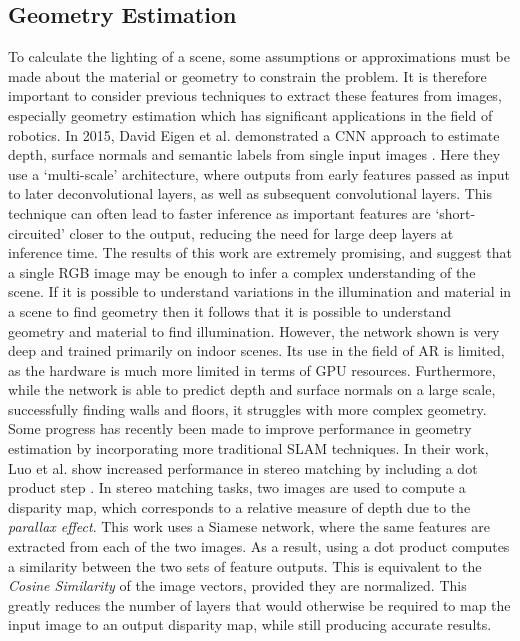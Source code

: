 \documentclass[ %
                    author={Gavin Parker},
                supervisor={Dr. Neill Campbell},
                    degree={MEng},
                     title={Deep Learning for Illumination Estimation from Stereo Images},
                  subtitle={},
                      type={Research},
                      year={2018} ]{dissertation}
\begin{document}
\subsection{Geometry Estimation}
To calculate the lighting of a scene, some assumptions or approximations must be made about the material or geometry to constrain the problem. It is therefore important to consider previous techniques to extract these features from images, especially geometry estimation which has significant applications in the field of robotics. In 2015, David Eigen et al. demonstrated a CNN approach to estimate depth, surface normals and semantic labels from single input images \cite{7410661}. Here they use a `multi-scale' architecture, where outputs from early features passed as input to later deconvolutional layers, as well as subsequent convolutional layers. This technique can often lead to faster inference as important features are `short-circuited' closer to the output, reducing the need for large deep layers at inference time. The results of this work are extremely promising, and suggest that a single RGB image may be enough to infer a complex understanding of the scene. If it is possible to understand variations in the illumination and material in a scene to find geometry then it follows that it is possible to understand geometry and material to find illumination.  However, the network shown is very deep and trained primarily on indoor scenes. Its use in the field of AR is limited, as the hardware is much more limited in terms of GPU resources. Furthermore, while the network is able to predict depth and surface normals on a large scale, successfully finding walls and floors, it struggles with more complex geometry. Some progress has recently been made to improve performance in geometry estimation by incorporating more traditional SLAM techniques. In their work, Luo et al. show increased performance in stereo matching by including a dot product step \cite{7780983}. In stereo matching tasks, two images are used to compute a disparity map, which corresponds to a relative measure of depth due to the \textit{parallax effect}. This work uses a Siamese network, where the same features are extracted from each of the two images. As a result, using a dot product computes a similarity between the two sets of feature outputs. This is equivalent to the \textit{Cosine Similarity} of the image vectors, provided they are normalized. This greatly reduces the number of layers that would otherwise be required to map the input image to an output disparity map, while still producing accurate results.
\end{document}
